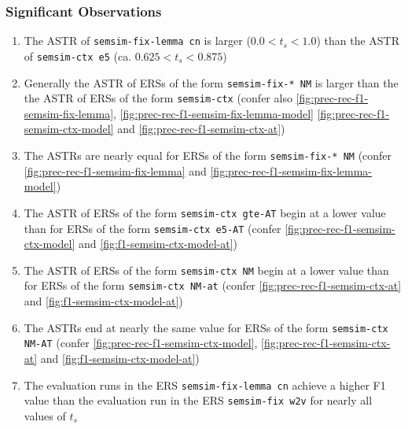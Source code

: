 \documentclass[11pt]{scrreprt}
\newcounter{listcounter}
\begin{document}
{\subsubsection{Significant Observations}
\begin{enumerate}[label=\arabic{listcounter}.\arabic*]
	\item The ASTR of \texttt{semsim-fix-lemma cn} is larger (\(0.0 < t_s < 1.0\)) than the ASTR of \texttt{semsim-ctx e5} (ca. \(0.625 < t_s < 0.875\)) \label{obs-itm:ASTR-lemma-fness-cn-higher-than-cness-e5}
	\item Generally the ASTR of ERSs of the form \texttt{semsim-fix-* NM} is larger than the the ASTR of ERSs of the form \texttt{semsim-ctx} (confer also \cref{fig:prec-rec-f1-semsim-fix-lemma}, \cref{fig:prec-rec-f1-semsim-fix-lemma-model} \cref{fig:prec-rec-f1-semsim-ctx-model} and \cref{fig:prec-rec-f1-semsim-ctx-at}) \label{obs-itm:ASTR-fness-higher-than-\gls{cness}}
	\item The ASTRs are nearly equal for ERSs of the form \texttt{semsim-fix-* NM} \label{obs-itm:ASTR-equal-\gls{fness}} (confer \cref{fig:prec-rec-f1-semsim-fix-lemma} and \cref{fig:prec-rec-f1-semsim-fix-lemma-model}) \label{obs-itm:ASTR-fness-equal}
	\item The ASTR of ERSs of the form \texttt{semsim-ctx gte-AT} begin at a lower value than for ERSs of the form \texttt{semsim-ctx e5-AT} (confer \cref{fig:prec-rec-f1-semsim-ctx-model} and \cref{fig:f1-semsim-ctx-model-at}) \label{obs-itm:ASTR-cness-gte-starts-earlier}
	\item The ASTR of ERSs of the form \texttt{semsim-ctx NM} begin at a lower value than for ERSs of the form \texttt{semsim-ctx NM-at} (confer \cref{fig:prec-rec-f1-semsim-ctx-at} and \cref{fig:f1-semsim-ctx-model-at}) \label{obs-itm:ASTR-cness-at-starts-earlier}
	\item The ASTRs end at nearly the same value for ERSs of the form \texttt{semsim-ctx NM-AT} \label{obs-itm:ASTR-equal-\gls{fness}} (confer \cref{fig:prec-rec-f1-semsim-ctx-model}, \cref{fig:prec-rec-f1-semsim-ctx-at} and \cref{fig:f1-semsim-ctx-model-at}) \label{obs-itm:ASTR-cness-end-equal}

	\item The evaluation runs in the ERS \texttt{semsim-fix-lemma cn} achieve a higher F1 value than the evaluation run in the ERS \texttt{semsim-fix w2v} for nearly all values of \(t_s\) \label{obs-itm:lemma-fness-higher-f1-nearly-always}


\end{enumerate}}
\end{document}
